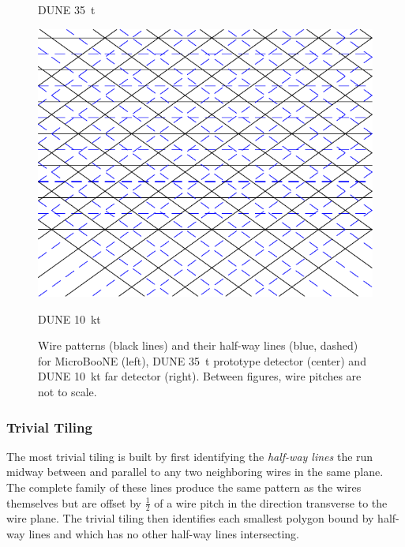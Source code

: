 \documentclass[letter]{article}
\begin{document}
\begin{figure}[htbp]
\begin{minipage}[b]{0.3\linewidth}
\begin{center}
        DUNE \SI{35}{\tonne}
    \end{center}
  \end{minipage}
  \begin{minipage}[b]{0.3\linewidth}
    \begin{center}
        \includegraphics[width=\textwidth]{wires-10kt.pdf}              

        DUNE \SI{10}{\kilo\tonne}
    \end{center}
  \end{minipage}

  \caption{Wire patterns (black lines) and their half-way lines (blue,
    dashed) for MicroBooNE (left), DUNE \SI{35}{\tonne} prototype detector
    (center) and DUNE \SI{10}{\kilo\tonne} far detector (right).
  Between figures, wire pitches are not to scale.}
  \label{fig:eyeball}
\end{figure}

\subsubsection{Trivial Tiling}

The most trivial tiling is built by first identifying the
\textit{half-way lines} the run midway between and parallel to any two
neighboring wires in the same plane.
The complete family of these lines produce the same pattern as the
wires themselves but are offset by $\frac{1}{2}$ of a wire pitch in
the direction transverse to the wire plane.
The trivial tiling then identifies each smallest polygon bound by
half-way lines and which has no other half-way lines intersecting.
\end{document}
